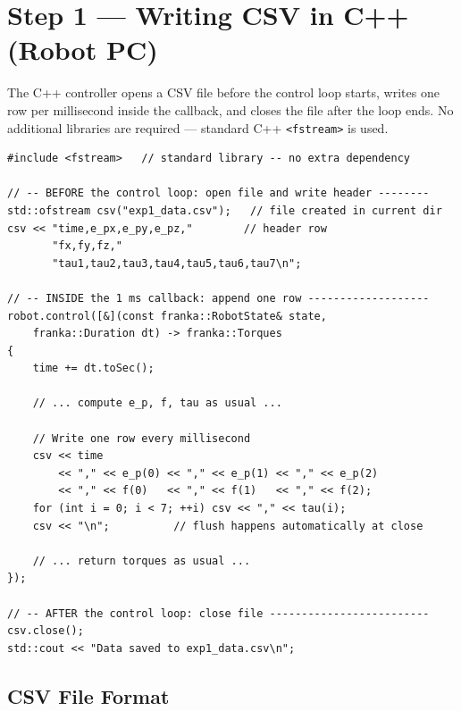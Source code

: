 \section{Step 1 --- Writing CSV in C++ (Robot PC)}

The C++ controller opens a CSV file before the control loop starts,
writes one row per millisecond inside the callback, and closes the file
after the loop ends.
No additional libraries are required --- standard C++ \texttt{<fstream>}
is used.

\begin{lstlisting}[style=cppstyle,
  caption={C++ CSV logging pattern used in all experiments},
  label={lst:csv_write}]
#include <fstream>   // standard library -- no extra dependency

// -- BEFORE the control loop: open file and write header --------
std::ofstream csv("exp1_data.csv");   // file created in current dir
csv << "time,e_px,e_py,e_pz,"        // header row
       "fx,fy,fz,"
       "tau1,tau2,tau3,tau4,tau5,tau6,tau7\n";

// -- INSIDE the 1 ms callback: append one row -------------------
robot.control([&](const franka::RobotState& state,
    franka::Duration dt) -> franka::Torques
{
    time += dt.toSec();

    // ... compute e_p, f, tau as usual ...

    // Write one row every millisecond
    csv << time
        << "," << e_p(0) << "," << e_p(1) << "," << e_p(2)
        << "," << f(0)   << "," << f(1)   << "," << f(2);
    for (int i = 0; i < 7; ++i) csv << "," << tau(i);
    csv << "\n";          // flush happens automatically at close

    // ... return torques as usual ...
});

// -- AFTER the control loop: close file -------------------------
csv.close();
std::cout << "Data saved to exp1_data.csv\n";
\end{lstlisting}

\subsection{CSV File Format}

